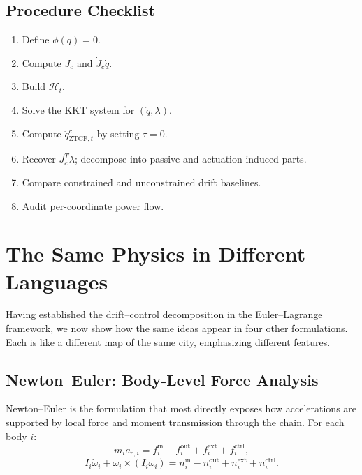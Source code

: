\documentclass[11pt]{article}
\begin{document}
\subsection{Procedure Checklist}

\begin{enumerate}
\item Define $\phi(q)=0$.
\item Compute $J_c$ and $\dot{J}_c\dot{q}$.
\item Build $\mathcal{H}_t$.
\item Solve the KKT system for $(\ddot{q},\lambda)$.
\item Compute $\ddot{q}_{\mathrm{ZTCF},t}^{c}$ by setting $\tau=0$.
\item Recover $J_c^T\lambda$; decompose into passive and actuation-induced parts.
\item Compare constrained and unconstrained drift baselines.
\item Audit per-coordinate power flow.
\end{enumerate}


\section{The Same Physics in Different Languages}\label{sec:other-frameworks}

Having established the drift--control decomposition in the Euler--Lagrange framework, we now show how the same ideas appear in four other formulations. Each is like a different map of the same city, emphasizing different features.

\subsection{Newton--Euler: Body-Level Force Analysis}\label{sec:newton-euler}

Newton--Euler is the formulation that most directly exposes how accelerations are supported by local force and moment transmission through the chain. For each body $i$:
\begin{equation}\label{eq:ne-trans}
m_i a_{c,i} = f_i^{\mathrm{in}} - f_i^{\mathrm{out}} + f_i^{\mathrm{ext}} + f_i^{\mathrm{ctrl}},
\end{equation}
\begin{equation}\label{eq:ne-rot}
I_i\dot\omega_i + \omega_i\times(I_i\omega_i) = n_i^{\mathrm{in}} - n_i^{\mathrm{out}} + n_i^{\mathrm{ext}} + n_i^{\mathrm{ctrl}}.
\end{equation}
\end{document}
